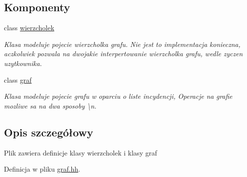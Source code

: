 \subsection*{Komponenty}
\begin{DoxyCompactItemize}
\item 
class \hyperlink{classwierzcholek}{wierzcholek}
\begin{DoxyCompactList}\small\item\em Klasa modeluje pojecie wierzcholka grafu. Nie jest to implementacja konieczna, aczkolwiek pozwala na dwojakie interpertowanie wierzcholka grafu, wedle zyczen uzytkownika. \end{DoxyCompactList}\item 
class \hyperlink{classgraf}{graf}
\begin{DoxyCompactList}\small\item\em Klasa modeluje pojecie grafu w oparciu o liste incydencji, Operacje na grafie mozliwe sa na dwa sposoby \textbackslash{}n. \end{DoxyCompactList}\end{DoxyCompactItemize}


\subsection{Opis szczegółowy}
Plik zawiera definicje klasy wierzcholek i klasy graf 

Definicja w pliku \hyperlink{graf_8hh_source}{graf.\-hh}.

